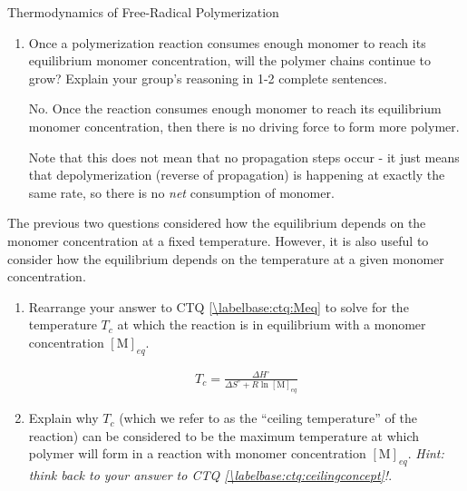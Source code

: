 \begin{activity}{Thermodynamics of Free-Radical Polymerization}
\begin{ctqs}
\begin{enumerate}
				\begin{solution}[1in]{}
					By Le Chatelier's principle, if $[\text{M}] > [\text{M}]_{eq}$, it is essentially like starting at equilibrium and adding excess monomer (a reagent).  This should push the reaction to the right and drive formation of polymer.
				\end{solution}
				
			\item Once a polymerization reaction consumes enough monomer to reach its equilibrium monomer concentration, will the polymer chains continue to grow?  Explain your group's reasoning in 1-2 complete sentences.
				
				\begin{solution}[1.5in]{}
					No. Once the reaction consumes enough monomer to reach its equilibrium monomer concentration, then there is no driving force to form more polymer.
					
					Note that this does not mean that no propagation steps occur - it just means that depolymerization (reverse of propagation) is happening at exactly the same rate, so there is no \emph{net} consumption of monomer.
				\end{solution}
				
		\end{enumerate}
	
	\question The previous two questions considered how the equilibrium depends on the monomer concentration at a fixed temperature. However, it is also useful to consider how the equilibrium depends on the temperature at a given monomer concentration.
	
		\begin{enumerate}
		
			\item Rearrange your answer to CTQ \ref{\labelbase:ctq:Meq} to solve for the temperature $T_c$ at which the reaction is in equilibrium with a monomer concentration $[\text{M}]_{eq}$.
				
				\begin{solution}[1in]{}
					\begin{align*}
						T_c = \frac{\Delta H^\circ}{\Delta S^\circ + R \ln [\text{M}]_{eq}}
					\end{align*}
				\end{solution}
				
			\item Explain why $T_c$ (which we refer to as the ``ceiling temperature'' of the reaction) can be considered to be the maximum temperature at which polymer will form in a reaction with monomer concentration $[\text{M}]_{eq}$. \emph{Hint: think back to your answer to CTQ \ref{\labelbase:ctq:ceilingconcept}!}.
				

\end{enumerate}
\end{ctqs}
\end{activity}
